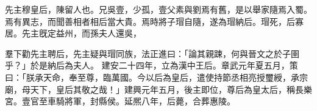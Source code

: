 \begin{pinyinscope}
 
 
 先主穆皇后，陳留人也。兄吳壹，少孤，壹父素與劉焉有舊，是以舉家隨焉入蜀。焉有異志，而聞善相者相后當大貴。焉時將子瑁自隨，遂為瑁納后。瑁死，后寡居。先主旣定益州，而孫夫人還吳，
 
 
 羣下勸先主聘后，先主疑與瑁同族，法正進曰：「論其親踈，何與晉文之於子圉乎？」於是納后為夫人。
 建安二十四年，立為漢中王后。章武元年夏五月，策曰：「朕承天命，奉至尊，臨萬國。今以后為皇后，遣使持節丞相亮授璽綬，承宗廟，母天下，皇后其敬之哉！」建興元年五月，後主即位，尊后為皇太后，稱長樂宮。壹官至車騎將軍，封縣侯。延熈八年，后薨，合葬惠陵。
 
 
\end{pinyinscope}